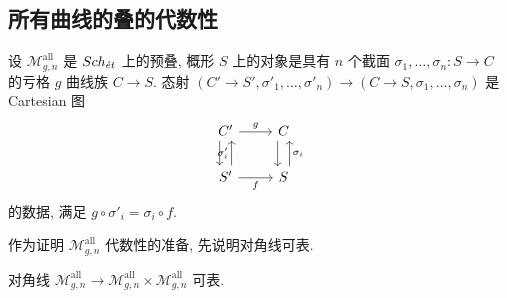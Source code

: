 \subsection{所有曲线的叠的代数性}\label{src:6.4.2-subsection}
\begin{definition}\label{src:6.4.4}
设 $\mathcal M_{g,\allowbreak n}^{\mathrm{all}}$ 是 $Sch_{\acute et}$ 上的预叠, 概形 $S$ 上的对象是具有 $n$ 个截面 $\sigma_1,\allowbreak \ldots,\allowbreak \sigma_n:S\to\allowbreak C$ 的亏格 $g$ 曲线族 $C\to\allowbreak S$. 态射 $(C'\to\allowbreak S',\allowbreak \sigma'_1,\allowbreak \ldots,\allowbreak \sigma'_n)\to(C\to\allowbreak S,\allowbreak \sigma_1,\allowbreak \ldots,\allowbreak \sigma_n)$ 是 Cartesian 图
\[
\begin{tikzcd}
C'\arrow[r,"g"]\arrow[d,shift right=1ex]&C\arrow[d,shift right=1ex]\\
S'\arrow[r,"f"']\arrow[u,shift right=1ex,"\sigma'_i"]&S\arrow[u,shift right=1ex,"\sigma_i"']
\end{tikzcd}
\]
的数据, 满足 $g\circ\sigma'_i=\sigma_i\circ f$.
\end{definition}
作为证明 $\mathcal M_{g,\allowbreak n}^{\mathrm{all}}$ 代数性的准备, 先说明对角线可表.
\begin{lemma}\label{src:6.4.5}
对角线 $\mathcal M_{g,\allowbreak n}^{\mathrm{all}}\to\mathcal M_{g,\allowbreak n}^{\mathrm{all}}\times\mathcal M_{g,\allowbreak n}^{\mathrm{all}}$ 可表.
\end{lemma}
